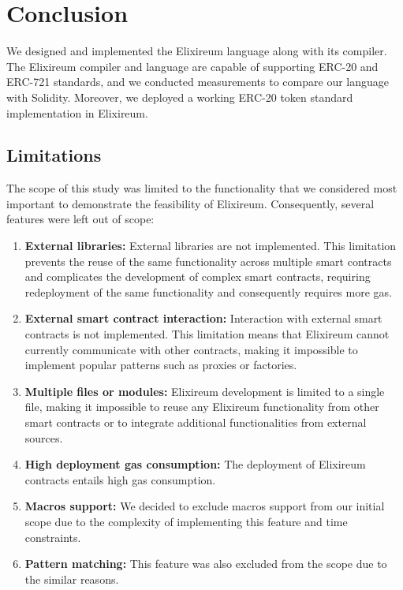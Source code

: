 \chapter{Conclusion}
\label{chap:concl}

We designed and implemented the Elixireum language along with its compiler. The Elixireum compiler and language are capable of supporting ERC-20 and ERC-721 standards, and we conducted measurements to compare our language with Solidity. Moreover, we deployed a working ERC-20 token standard implementation in Elixireum.

\section{Limitations}

The scope of this study was limited to the functionality that we considered most important to demonstrate the feasibility of Elixireum. Consequently, several features were left out of scope:

\begin{enumerate}
\item \textbf{External libraries:} External libraries are not implemented. This limitation prevents the reuse of the same functionality across multiple smart contracts and complicates the development of complex smart contracts, requiring redeployment of the same functionality and consequently requires more gas.
\item \textbf{External smart contract interaction:} Interaction with external smart contracts is not implemented. This limitation means that Elixireum cannot currently communicate with other contracts, making it impossible to implement popular patterns such as proxies or factories.
\item \textbf{Multiple files or modules:} Elixireum development is limited to a single file, making it impossible to reuse any Elixireum functionality from other smart contracts or to integrate additional functionalities from external sources.
\item \textbf{High deployment gas consumption:} The deployment of Elixireum contracts entails high gas consumption.
\item \textbf{Macros support:} We decided to exclude macros support from our initial scope due to the complexity of implementing this feature and time constraints.
\item \textbf{Pattern matching:} This feature was also excluded from the scope due to the similar reasons.
\end{enumerate}

